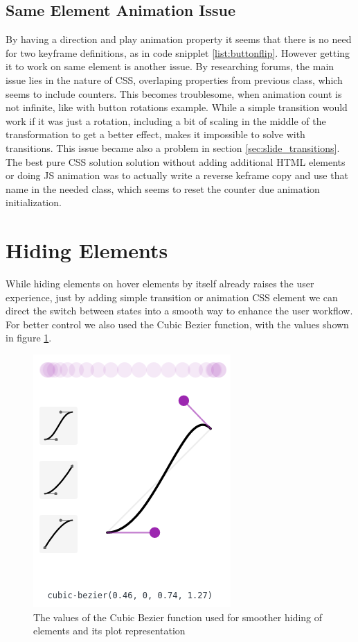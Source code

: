 \subsection{Same Element Animation Issue} %
\label{sub:same_element_animation_issue}

By having a direction and play animation property it seems that there is no need for two keyframe definitions, as in code snipplet \ref{list:buttonflip}. However getting it to work on same element is another issue. By researching forums, the main issue lies in the nature of CSS, overlaping properties from previous class, which seems to include counters. This becomes troublesome, when animation count is not infinite, like with button rotations example. While a simple transition would work if it was just a rotation, including a bit of scaling in the middle of the transformation to get a better effect, makes it impossible to solve with transitions. This issue became also a problem in section \ref{sec:slide_transitions}. The best pure CSS solution solution without adding additional HTML elements or doing JS animation was to actually write a reverse keframe copy and use that name in the needed class, which seems to reset the counter due animation initialization.



\section{Hiding Elements} %
\label{sec:hiding_elements}

While hiding elements on hover elements by itself already raises the user experience, just by adding simple transition or animation CSS element we can direct the switch between states into a smooth way to enhance the user workflow. For better control we also used the Cubic Bezier function, with the values shown in figure \ref{fig:cubic-bezier}.

\begin{figure}[tp]
	\centering
	\includegraphics[width = .4\textwidth]{images/cubic-bezier.png}
	
	\caption[Cubic Bezier Function]{
		The values of the Cubic Bezier function used for smoother hiding of elements and its plot representation
	}
	\label{fig:cubic-bezier}
\end{figure}


